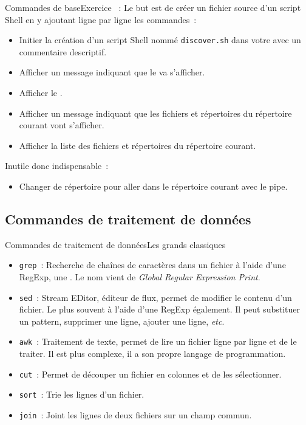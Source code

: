 \documentclass{beamer}
\begin{document}
    \begin{frame}{Commandes de base}{Exercice \execcounterdispinc{}~:}
        Le but est de créer un fichier source d'un script Shell en y ajoutant ligne par ligne les commandes~:
        \begin{itemize}
            \item Initier la création d'un script Shell nommé \lstinline{discover.sh} dans votre  avec un commentaire descriptif.
            \item Afficher un message indiquant que le  va s'afficher.
            \item Afficher le .
            \item Afficher un message indiquant que les fichiers et répertoires du répertoire courant vont s'afficher.
            \item Afficher la liste des fichiers et répertoires du répertoire courant.
        \end{itemize}

        Inutile donc indispensable~:
        \begin{itemize}
            \item Changer de répertoire pour aller dans le répertoire courant avec le pipe.
        \end{itemize}
    \end{frame}

    \subsection{Commandes de traitement de données}\label{subsec:commandes-donnees}

    \begin{frame}{Commandes de traitement de données}{Les grands classiques}
        \begin{itemize}
            \item \lstinline{grep}~: Recherche de chaînes de caractères dans un fichier à l'aide d'une RegExp, une .
            Le nom vient de \textit{Global Regular Expression Print}.
            \item \lstinline{sed}~: Stream EDitor, éditeur de flux, permet de modifier le contenu d'un fichier.
            Le plus souvent à l'aide d'une RegExp également.
            Il peut substituer un pattern, supprimer une ligne, ajouter une ligne, \textit{etc}.
            \item \lstinline{awk}~: Traitement de texte, permet de lire un fichier ligne par ligne et de le traiter.
            Il est plus complexe, il a son propre langage de programmation.
            \item \lstinline{cut}~: Permet de découper un fichier en colonnes et de les sélectionner.
            \item \lstinline{sort}~: Trie les lignes d'un fichier.
            \item \lstinline{join}~: Joint les lignes de deux fichiers sur un champ commun.
        \end{itemize}
    \end{frame}
\end{document}

